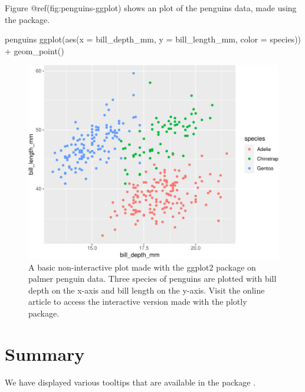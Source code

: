 Figure @ref(fig:penguins-ggplot) shows an plot of the penguins data,
made using the  package.

\begin{Schunk}
\begin{Sinput}
penguins %
  ggplot(aes(x = bill_depth_mm, y = bill_length_mm, 
             color = species)) + 
  geom_point()
\end{Sinput}
\begin{figure}
\includegraphics{paper-with-errors_files/figure-latex/penguins-ggplot-1} \caption[A basic non-interactive plot made with the ggplot2 package on palmer penguin data]{A basic non-interactive plot made with the ggplot2 package on palmer penguin data. Three species of penguins are plotted with bill depth on the x-axis and bill length on the y-axis. Visit the online article to access the interactive version made with the plotly package.}\label{fig:penguins-ggplot}
\end{figure}
\end{Schunk}

\hypertarget{summary}{%
\section{Summary}\label{summary}}

We have displayed various tooltips that are available in the package
.



\address{%
Quietest Quokka\\
University of Little Mates\\%
Department of Letter Q\\ Somewhere, Australia\\
%
\url{https://www.britannica.com/animal/quokka}\\%
\textit{ORCiD: \href{https://orcid.org/0000-1721-1511-1101}{0000-1721-1511-1101}}\\%
\href{mailto:qquo@ulm.edu}{\nolinkurl{qquo@ulm.edu}}%
}

\address{%
Bounciest Bilby\\
University of Little Mates\\%
Department of Letter B\\ Somewhere, Australia\\
%
\url{https://www.britannica.com/animal/bilby}\\%
\textit{ORCiD: \href{https://orcid.org/0000-0002-0912-0225}{0000-0002-0912-0225}}\\%
\href{mailto:bbil@ulm.edu}{\nolinkurl{bbil@ulm.edu}}%
}
